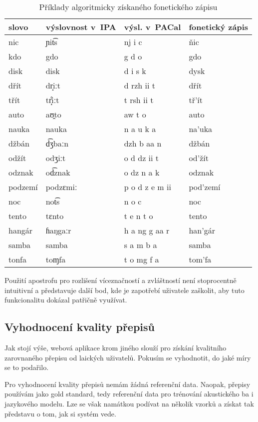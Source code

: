 \begin{table}[htpb]
\begin{center}
\begin{tabular}{|l|l|l|l|}
\hline
slovo & výslovnost v~IPA & výsl. v~PACal & fonetický zápis \\
\hline
nic & ɲit͡s  & nj i c & ňic \\
kdo & gdo & g d o & gdo \\
disk & disk & d i s k & dysk \\
dřít & dr̝iːt & d rzh ii t & dřít \\
třít & tr̝̊iːt & t rsh ii t & tř'ít \\
auto & aʊ̯to & aw t o & auto \\
nauka & nauka & n a u k a & na'uka \\
džbán & d͡ʒbaːn  & dzh b aa n & džbán \\
odžít & odʒiːt & o d dz ii t & od'žít \\
odznak & od͡znak  & o dz n a k & odznak \\
podzemí & podzɛmiː & p o d z e m ii & pod'zemí \\
noc & not͡s  & n o c & noc \\
tento & tɛnto & t e n t o & tento \\
hangár & ɦaŋgaːr & h a ng g aa r & han'gár \\
samba & samba & s a m b a & samba \\
tonfa & toɱfa & t o mg f a & tom'fa \\
\hline
\end{tabular}
\caption{Příklady algoritmicky získaného fonetického zápisu}\label{tab:priklady-fonetiky}
\end{center}
\end{table}
\normalfont

Použití apostrofu pro rozlišení víceznačností a zvláštností není stoprocentně
intuitivní a představuje další bod, kde je zapotřebí uživatele zaškolit, aby
tuto funkcionalitu dokázal patřičně využívat.

\subsection{Vyhodnocení kvality přepisů}

Jak stojí výše, webová aplikace krom jiného slouží pro získání kvalitního
zarovnaného přepisu od laických uživatelů. Pokusím se vyhodnotit, do jaké míry
se to podařilo.

Pro vyhodnocení kvality přepisů nemám žádná referenční data. Naopak, přepisy
používám jako gold standard, tedy referenční data pro trénování akustického ba i
jazykového modelu. Lze se však namátkou podívat na několik vzorků a získat tak
představu o tom, jak si systém vede.

